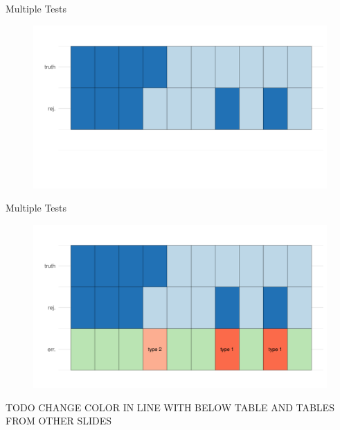 \documentclass[xcolor={dvipsnames}]{beamer}
\begin{document}
\begin{frame}{Multiple Tests}
    \begin{figure}
        \centering
        \includegraphics[width = \textwidth]{Slides/MTP/plaatjes/mt2.pdf}
    \end{figure}
\end{frame}

\begin{frame}{Multiple Tests}
    \begin{figure}
        \centering
        \includegraphics[width = \textwidth]{Slides/MTP/plaatjes/mt3.pdf}

    \end{figure}
    TODO CHANGE COLOR IN LINE WITH BELOW TABLE AND TABLES FROM OTHER SLIDES
\end{frame}
\end{document}
